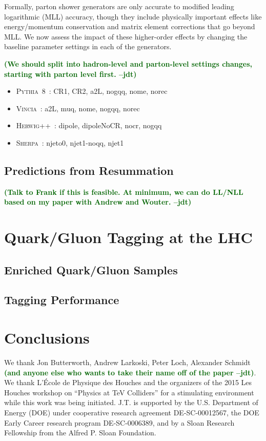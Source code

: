 \documentclass[11pt,letterpaper]{article}
\newcommand{\pythia}{\textsc{Pythia~8}\xspace}
\newcommand{\herwig}{\textsc{Herwig++}\xspace}
\newcommand{\vincia}{\textsc{Vincia}\xspace}
\newcommand{\sherpa}{\textsc{Sherpa}\xspace}
\newcommand{\jdt}[1]{\textbf{\textcolor{darkgreen}{(#1 --jdt)}}}
\begin{document}
Formally, parton shower generators are only accurate to modified leading logarithmic (MLL) accuracy, though they include physically important effects like energy/momentum conservation and matrix element corrections that go beyond MLL.  We now assess the impact of these higher-order effects by changing the baseline parameter settings in each of the generators.

\jdt{We should split into hadron-level and parton-level settings changes, starting with parton level first.}


\begin{itemize}
\item \pythia\ : CR1, CR2, a2L, nogqq, nome, norec
\item \vincia\ : a2L, muq, nome, nogqq, norec
\item \herwig\ : dipole, dipoleNoCR, nocr, nogqq
\item \sherpa\ : njeto0, njet1-noqq, njet1
\end{itemize}


\subsection{Predictions from Resummation}

\jdt{Talk to Frank if this is feasible.  At minimum, we can do LL/NLL based on my paper with Andrew and Wouter.}

\section{Quark/Gluon Tagging at the LHC}
\label{sec:pp}

\subsection{Enriched Quark/Gluon Samples}

\subsection{Tagging Performance}


\section{Conclusions}
\label{sec:conclude}




\begin{acknowledgments}
We thank Jon Butterworth, Andrew Larkoski, Peter Loch, Alexander Schmidt \jdt{and anyone else who wants to take their name off of the paper}.  We thank L'\'{E}cole de Physique des Houches and the organizers of the 2015 Les Houches workshop on ``Physics at TeV Colliders'' for a stimulating environment while this work was being initiated.  J.T. is supported by the U.S. Department of Energy (DOE) under cooperative research agreement DE-SC-00012567, the DOE Early Career research program DE-SC-0006389, and by a Sloan Research Fellowship from the Alfred P. Sloan Foundation.

\end{acknowledgments}




\end{document}
